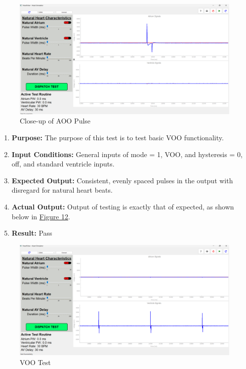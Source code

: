 \documentclass{article}
\newcounter{subsubsubsection}[subsubsection]
\begin{document}
\begin{tcolorbox}
    \begin{figure}[H]
        \label{AOOpulse}
        \includegraphics[width=\textwidth]{AOOPulseClose.png}
        \caption{Close-up of AOO Pulse}
    \end{figure}
\end{tcolorbox}

\newpage
{}

\begin{enumerate}[label=]
   \item \textbf{Purpose:} The purpose of this test is to test basic VOO functionality.
   \item \textbf{Input Conditions:} General inputs of mode = 1, VOO, and hysteresis = 0, off, and standard 
   ventricle inputs. 
   \item \textbf{Expected Output:} Consistent, evenly spaced pulses in the output with disregard for natural heart beats.
   \item \textbf{Actual Output:} Output of testing is exactly that of expected, as shown below in \hyperref[VOOtest]{Figure 12}.
   \item \textbf{Result:} Pass
\end{enumerate}

\begin{tcolorbox}
    \begin{figure}[H]
        \label{VOOtest}
        \includegraphics[width=\textwidth]{VOOtest.png}
        \caption{VOO Test}
    \end{figure}
\end{tcolorbox}
\end{document}

